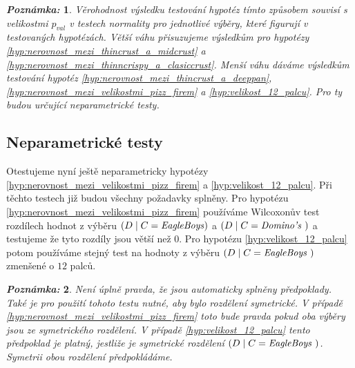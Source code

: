 \documentclass[czech]{article}
\newtheorem*{note}{\textsl{Poznámka:}}
\begin{document}
\begin{note}
	Věrohodnost výsledku testování hypotéz tímto způsobem souvisí s velikostmi $p_{val}$ v testech
	normality pro jednotlivé výběry, které figurují v testovaných hypotézách. Větší
	váhu přisuzujeme výsledkům pro hypotézy \ref{hyp:nerovnost_mezi_thincrust_a_midcrust} a
	\ref{hyp:nerovnost_mezi_thinncrispy_a_clasiccrust}. Menší váhu dáváme výsledkům testování hypotéz
	\ref{hyp:nerovnost_mezi_thincrust_a_deeppan}, \ref{hyp:nerovnost_mezi_velikostmi_pizz_firem} a
	\ref{hyp:velikost_12_palcu}. Pro ty budou určující neparametrické testy.
\end{note}


\subsection{Neparametrické testy}%
\label{sub:neparametrické_testy}

Otestujeme nyní ještě neparametricky hypotézy \ref{hyp:nerovnost_mezi_velikostmi_pizz_firem} a
\ref{hyp:velikost_12_palcu}. Při těchto testech již budou všechny požadavky splněny. Pro hypotézu
\ref{hyp:nerovnost_mezi_velikostmi_pizz_firem} používáme Wilcoxonův test rozdílech hodnot z
výběru \(\left( D \mid C = \text{\emph{EagleBoys}} \right)\) a \(\left( D \mid C =
\text{\emph{Domino's} } \right)\) a testujeme že tyto rozdíly jsou větší než \(0\).  Pro hypotézu
\ref{hyp:velikost_12_palcu} potom používáme stejný test na hodnoty z výběru \(\left( D \mid C =
\text{\emph{EagleBoys} } \right)\) zmenšené o \(12\) palců.

\begin{note}
	Není úplně pravda, že jsou automaticky splněny předpoklady. Také je pro použití tohoto testu
	nutné, aby bylo rozdělení symetrické. V případě \ref{hyp:nerovnost_mezi_velikostmi_pizz_firem}
	toto bude pravda pokud oba výběry jsou ze symetrického rozdělení. V případě
	\ref{hyp:velikost_12_palcu} tento předpoklad je platný, jestliže je symetrické rozdělení  \(\left( D \mid C =
	\text{\emph{EagleBoys} } \right)\). Symetrii obou rozdělení předpokládáme.
\end{note}
\end{document}
